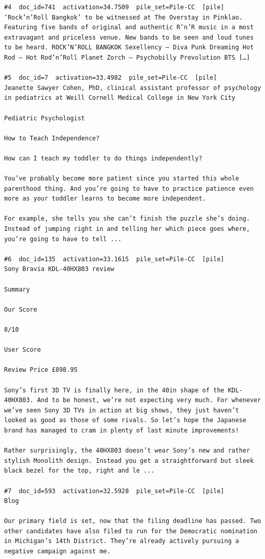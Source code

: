 \begin{verbatim}
#4  doc_id=741  activation=34.7509  pile_set=Pile-CC  [pile]
‘Rock’n’Roll Bangkok’ to be witnessed at The Overstay in Pinklao. Featuring five bands of original and authentic R’n’R music in a most extravagant and priceless venue. New bands to be seen and loud tunes to be heard. ROCK’N’ROLL BANGKOK Sexellency – Diva Punk Dreaming Hot Rod – Hot Rod’n’Roll Planet Zorch – Psychobilly Prevolution BTS […]

#5  doc_id=7  activation=33.4982  pile_set=Pile-CC  [pile]
Jeanette Sawyer Cohen, PhD, clinical assistant professor of psychology in pediatrics at Weill Cornell Medical College in New York City

Pediatric Psychologist

How to Teach Independence?

How can I teach my toddler to do things independently?

You’ve probably become more patient since you started this whole parenthood thing. And you’re going to have to practice patience even more as your toddler learns to become more independent.

For example, she tells you she can’t finish the puzzle she’s doing. Instead of jumping right in and telling her which piece goes where, you’re going to have to tell ...

#6  doc_id=135  activation=33.1615  pile_set=Pile-CC  [pile]
Sony Bravia KDL-40HX803 review

Summary

Our Score

8/10

User Score

Review Price £898.95

Sony’s first 3D TV is finally here, in the 40in shape of the KDL-40HX803. And to be honest, we’re not expecting very much. For whenever we’ve seen Sony 3D TVs in action at big shows, they just haven’t looked as good as those of some rivals. So let’s hope the Japanese brand has managed to cram in plenty of last minute improvements!

Rather surprisingly, the 40HX803 doesn’t wear Sony’s new and rather stylish Monolith design. Instead you get a straightforward but sleek black bezel for the top, right and le ...

#7  doc_id=593  activation=32.5928  pile_set=Pile-CC  [pile]
Blog

Our primary field is set, now that the filing deadline has passed. Two other candidates have also filed to run for the Democratic nomination in Michigan’s 14th District. They’re already actively pursuing a negative campaign against me.


\end{verbatim}
